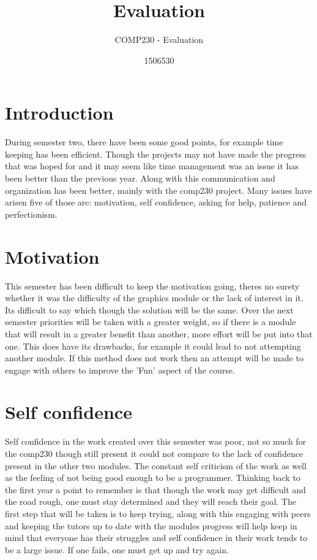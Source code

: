 \documentclass{scrartcl}
\title{Evaluation}
\subtitle{COMP230 - Evaluation}
\author{1506530}
\begin{document}
	
\maketitle

\section{Introduction}

During semester two, there have been some good points, for example time keeping has been efficient. Though the projects may not have made the progress that was hoped for and it may seem like time management was an issue it has been better than the previous year. Along with this communication and organization has been better, mainly with the comp230 project. Many issues have arisen five of those are: motivation, self confidence, asking for help, patience and perfectionism.

\section{Motivation}

This semester has been difficult to keep the motivation going, theres no surety whether it was the difficulty of the graphics module or the lack of interest in it. Its difficult to say which though the solution will be the same. Over the next semester priorities will be taken with a greater weight, so if there is a module that will result in a greater benefit than another, more effort will be put into that one. This does have its drawbacks, for example it could lead to not attempting another module. If this method does not work then an attempt will be made to engage with others to improve the 'Fun' aspect of the course.

\section{Self confidence}

Self confidence in the work created over this semester was poor, not so much for the comp230 though still present it could not compare to the lack of confidence present in the other two modules. The constant self criticism of the work as well as the feeling of not being good enough to be a programmer. Thinking back to the first year a point to remember is that though the work may get difficult and the road rough, one must stay determined and they will reach their goal. The first step that will be taken is to keep trying, along with this engaging with peers and keeping the tutors up to date with the modules progress will help keep in mind that everyone has their struggles and self confidence in their work tends to be a large issue. If one fails, one must get up and try again. 
\end{document}
